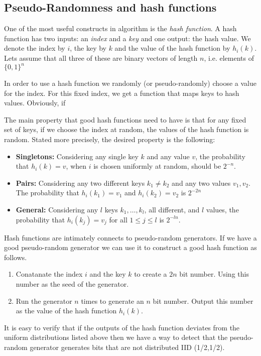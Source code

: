 \subsection{Pseudo-Randomness and hash functions}
One of the most useful constructs in algorithm is the {\em hash
  function}. A hash function has two inputs: an {\em index} and a {\em
  key} and one output: the hash value. We denote the index by $i$, the
key by $k$ and the value of the hash function by $h_i(k)$.  Lets
assume that all three of these are binary vectors of length $n$,
i.e. elements of $\{0,1\}^n$

In order to use a hash function we randomly (or pseudo-randomly)
choose a value for the index. For this fixed index, we get a function
that maps keys to hash values. Obviously, if 

The main property that good hash functions need to have is that for
any fixed set of keys, if we choose the index at random, the values of
the hash function is random. Stated more precisely, the desired property is
the following:
\begin{itemize}
\item {\bf Singletons:} Considering any single key $k$ and any value
  $v$, the probability that $h_i(k)=v$, when $i$ is chosen uniformly
  at random, should be $2^{-n}$.
\item {\bf Pairs:} Considering any two different keys $k_1 \neq k_2$
  and any two values $v_1,v_2$. The probability that $h_i(k_1)=v_1$
  and $h_i(k_2)=v_2$ is $2^{-2n}$
\item {\bf General:} Considering any $l$ keys $k_1,\ldots,k_l$, all
  different, and $l$ values, the probability that $h_i(k_j)=v_j$ for
  all $1\leq j \leq l$ is $2^{-ln}$.
\end{itemize}

Hash functions are intimately connects to pseudo-random
generators. If we have a good pseudo-random generator we can use it to
construct a good hash function as follows.
\begin{enumerate}
\item Conatanate the index $i$ and the key $k$ to create a $2n$ bit
  number. Using this number as the seed of the generator.
\item Run the generator $n$ times to generate an $n$ bit
  number. Output this number as the value of the hash function $h_i(k)$.
\end{enumerate}

It is easy to verify that if the outputs of the hash function deviates from the
uniform distributions listed above then we have a way to detect that the
pseudo-random generator generates bits that are not distributed IID (1/2,1/2).


